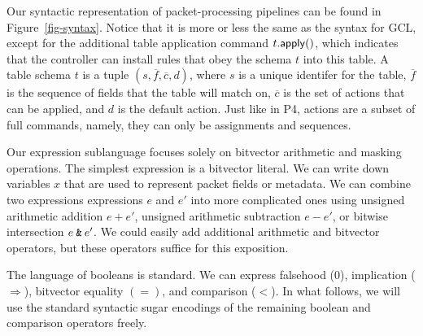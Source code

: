 Our syntactic representation of packet-processing pipelines can be
found in Figure~\ref{fig-syntax}. Notice that it is more or less the
same as the syntax for GCL, except for the additional table
application command $t.\mathsf{apply}()$, which indicates that the controller
can install rules that obey the schema $t$ into this table. A table
schema $t$ is a tuple $(s, \overline f, \overline c, d)$, where $s$ is
a unique identifer for the table, $\overline f$ is the sequence of
fields that the table will match on, $\overline c$ is the set of
actions that can be applied, and $d$ is the default action. Just like
in P4, actions are a subset of full commands, namely, they can only be
assignments and sequences.

Our expression sublanguage focuses solely on bitvector arithmetic and
masking operations. The simplest expression is a bitvector literal. We
can write down variables $x$ that are used to represent packet fields
or metadata. We can combine two expressions expressions $e$ and $e'$
into more complicated ones using unsigned arithmetic addition
$e + e'$, unsigned arithmetic subtraction $e - e'$, or bitwise
intersection $e \mathbin{\texttt{\&}} e'$. We could easily add additional arithmetic
and bitvector operators, but these operators suffice for this
exposition.

The language of booleans is standard. We can express falsehood ($0$),
implication ($\Rightarrow$), bitvector equality $(=)$, and comparison
($<$). In what follows, we will use the standard syntactic sugar
encodings of the remaining boolean and comparison operators freely.

